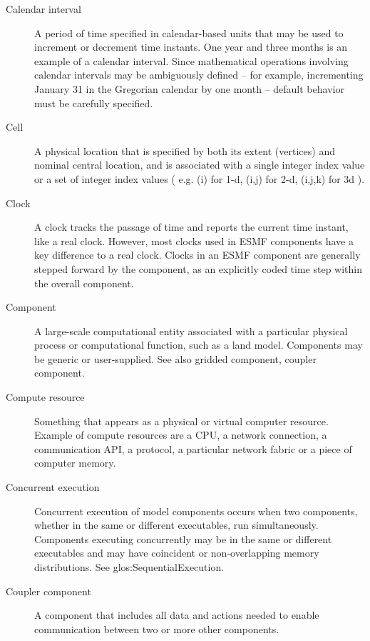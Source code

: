 \begin{description}
\item[Calendar interval] \label{glos:CalInt} A period of time specified
in calendar-based units that may be used to increment or decrement time instants.  
One year and three months is an example of a calendar interval.  Since 
mathematical operations involving calendar intervals may be ambiguously 
defined -- for example, incrementing January 31 in the Gregorian calendar by 
one month -- default behavior must be carefully specified.  

\item[Cell] \label{glos:Cell} A physical location that is specified by both 
  its extent (vertices) and nominal central location, and is associated with 
  a single integer index value or a set of integer index values ( e.g.
  (i) for 1-d, (i,j) for 2-d, (i,j,k) for 3d ).

\item[Clock] \label{glos:Clock} A clock tracks the passage of time and 
reports the current time instant, like a real clock.  However, most clocks 
used in ESMF components have a key difference to a real clock. Clocks 
in an ESMF component are generally stepped forward by the component, as an 
explicitly coded time step within the overall component.

\item[Component] \label{glos:Component} A large-scale computational entity 
  associated with a particular physical process or computational function, 
  such as a land model.  Components may be generic or user-supplied.  
  See also gridded component, coupler component.

\item[Compute resource] \label{glos:CompResource} Something that appears as a
  physical or virtual computer resource. Example of compute resources
  are a CPU, a network connection, a communication API, a protocol, a 
  particular network fabric or a piece of computer memory. 

\item[Concurrent execution] \label{glos:ConcurrentExecution} 
Concurrent execution of model components occurs when two components,
whether in the same or different executables, run simultaneously.
Components executing concurrently may be in the same or different 
executables and may have coincident or non-overlapping memory 
distributions.  See 
{glos:SequentialExecution}.

\item[Coupler component] \label{glos:Coupler}
  A component that includes all data and actions needed to enable 
  communication between two or more other components.


\end{description}
